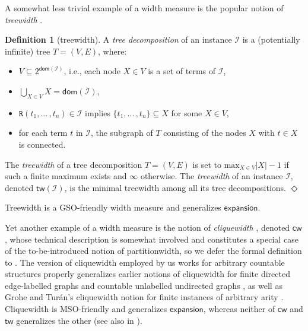 \documentclass[10pt,a4paper]{amsart}
\theoremstyle{definition}
\numberwithin{equation}{section}
\theoremstyle{plain}
\theoremstyle{definition}
\newtheorem{definition}[definition]{Definition}
\theoremstyle{myexample}
\theoremstyle{plain}
\theoremstyle{definition}
\newcommand{\instance}{\mathcal{I}}
\newcommand{\inst}{\instance}
\newcommand{\adom}[1]{\fcn{dom}(#1)}
\newcommand{\treewidth}[1]{\fcn{tw}(#1)}
\newcommand{\fcn}[1]{\mathsf{#1}}
\newcommand{\pred}[1]{\mathtt{#1}}
\newcommand{\tree}{T}
\newcommand{\rpred}{\pred{R}}
\newcommand{\defend}{\hfill\ensuremath{\Diamond}}
\begin{document}
\medskip {}
A somewhat less trivial example of a width measure is the popular notion of \emph{treewidth} \cite{ROBERTSON198449}.

\begin{definition}[treewidth]
A \emph{tree decomposition} of an instance $\inst$ is a (potentially infinite) tree $\tree = (V,E)$, where:
\begin{itemize}

\item $V \subseteq 2^{\adom{\inst}}$, i.e., each node $X \in V$ is a set of terms of $\inst$, 
\item $\bigcup_{X \in V} X = \adom{\inst}$,

\item $\rpred(t_{1}, ...\,,t_{n}) \in \inst$ implies $\{t_{1}, ...\,,t_{n}\} \subseteq X$ for some $X \in V$,

\item for each term $t$ in $\inst$, the subgraph of $T$ consisting of the nodes $X$ with $t \in X$ is connected.
\end{itemize}

The \emph{treewidth} of a tree decomposition $\tree = (V,E)$ is set to $\mathrm{max}_{X \in V} |X| - 1 $ if such a finite maximum exists and $\infty$ otherwise. The \emph{treewidth} of an instance $\inst$, denoted $\treewidth{\inst}$, is the minimal treewidth among all its tree decompositions. \defend
\end{definition}

Treewidth is a GSO-friendly width measure \cite[Thm. 9.18]{CourEngBook} and generalizes $\fcn{expansion}$.

\pagebreak

\medskip {}
Yet another example of a width measure is the notion of \emph{cliquewidth} \cite{ICDT2023}, denoted $\fcn{cw}$, whose technical description is somewhat involved and constitutes a special case of the to-be-introduced notion of partitionwidth, so we defer the formal definition to . The version of cliquewidth employed by us works for arbitrary countable structures properly generalizes earlier notions of cliquewidth for finite directed edge-labelled graphs \cite{CourEngBook} and countable un\-label\-led un\-di\-rec\-ted graphs \cite{Cou04}, as well as 
Grohe and Turán's cliquewidth notion for finite instances of arbitrary arity \cite{GroheT04}. %
%
Cliquewidth is MSO-friendly \cite[Thm. 11]{ICDT2023} and generalizes $\fcn{expansion}$, whereas neither of $\fcn{cw}$ and $\fcn{tw}$ generalizes the other (see also  in ). 
\end{document}

